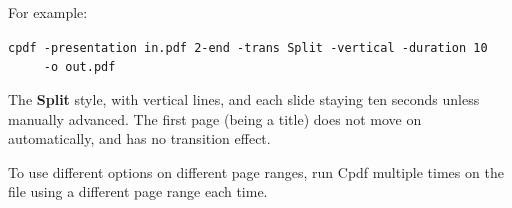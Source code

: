 \documentclass{book}
\begin{document}
\noindent For example:

\begin{framed}
  \small
  \noindent\verb!cpdf -presentation in.pdf 2-end -trans Split -vertical -duration 10!\\
  \noindent\verb!     -o out.pdf!

  \vspace{2.5mm}
  \noindent The \textbf{Split} style, with vertical lines, and each slide staying ten
seconds unless manually advanced. The first page (being a title) does not move
on automatically, and has no transition effect.

\end{framed}

\noindent To use different options on different page ranges, run Cpdf multiple times on
the file using a different page range each time.
\end{document}
